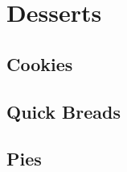 \documentclass[twoside, openany]{book}
\newcommand{\dish}[1]{}
\begin{document}
\chapter{Desserts}


\section{Cookies}

\dish{Brown_butter_chocolate_chip_cookies}

\dish{C4_cookies}

\dish{Gingerbread}

\dish{Lebkuchen}

\dish{Pride_of_iowa}

\dish{Pride_of_iowa_refrigerator}

\dish{Pumpkin_cookies}

\dish{Snickerdoodles}

\dish{Sugar_cookies}

\dish{Chocolate_peanut_tartlets}


\section{Quick Breads}

\dish{Banana_bread}

\dish{Orange_bread}

\dish{Pumpkin_bread}

\dish{Rhubarb_coffee_cake}

\dish{Scones}

\dish{Ginger_biscuits}

\dish{Pumpkin_walnut_muffins}

\dish{Blueberry_walnut_muffins}

\dish{Red_velvet_brownies}

\dish{Fudgy_brownies}

\dish{Lembas}

\dish{Nutella_brownies}

\dish{Raspberry_scones}


\section{Pies}

\dish{Pie_dough}

\dish{Apple_pie}
\end{document}
